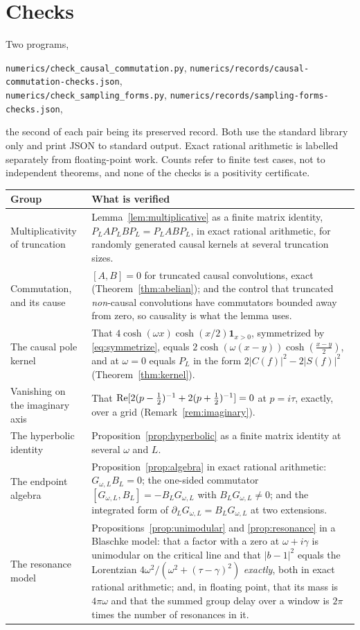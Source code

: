 \section{Checks}\label{app:checks}

Two programs,
\begin{center}
\texttt{numerics/check\_causal\_commutation.py},\qquad
\texttt{numerics/records/causal-commutation-checks.json},\\[2pt]
\texttt{numerics/check\_sampling\_forms.py},\qquad
\texttt{numerics/records/sampling-forms-checks.json},
\end{center}
the second of each pair being its preserved record. Both use the standard library
only and print JSON to standard output. Exact rational arithmetic is labelled separately
from floating-point work. Counts refer to finite test cases, not to independent
theorems, and none of the checks is a positivity certificate.

\begin{center}
\begin{tabular}{@{}p{}p{}@{}}
\toprule
Group & What is verified\\
\midrule
Multiplicativity of truncation &
Lemma~\ref{lem:multiplicative} as a finite matrix identity,
$P_LAP_LBP_L=P_LABP_L$, in exact rational arithmetic, for randomly generated
causal kernels at several truncation sizes.\\
Commutation, and its cause &
$[A,B]=0$ for truncated causal convolutions, exact
(Theorem~\ref{thm:abelian}); and the control that truncated \emph{non}-causal
convolutions have commutators bounded away from zero, so causality is what the
lemma uses.\\
The causal pole kernel &
That $4\cosh(\omega x)\cosh(x/2)\mathbf1_{x>0}$, symmetrized by
\eqref{eq:symmetrize}, equals $2\cosh(\omega(x-y))\cosh(\frac{x-y}2)$, and at
$\omega=0$ equals $P_L$ in the form $2|C(f)|^2-2|S(f)|^2$
(Theorem~\ref{thm:kernel}).\\
Vanishing on the imaginary axis &
That $\operatorname{Re}[2(p-\frac12)^{-1}+2(p+\frac12)^{-1}]=0$ at $p=i\tau$, exactly, over a
grid (Remark~\ref{rem:imaginary}).\\
The hyperbolic identity &
Proposition~\ref{prop:hyperbolic} as a finite matrix identity at several
$\omega$ and $L$.\\
The endpoint algebra &
Proposition~\ref{prop:algebra} in exact rational arithmetic: $G_{\omega,L}B_L=0$;
the one-sided commutator $[G_{\omega,L},B_L]=-B_LG_{\omega,L}$ with
$B_LG_{\omega,L}\neq0$; and the integrated form of
$\partial_LG_{\omega,L}=B_LG_{\omega,L}$ at two extensions.\\
The resonance model &
Propositions~\ref{prop:unimodular} and \ref{prop:resonance} in a Blaschke model:
that a factor with a zero at $\omega+i\gamma$ is unimodular on the critical line
and that $|b-1|^2$ equals the Lorentzian $4\omega^2/(\omega^2+(\tau-\gamma)^2)$
\emph{exactly}, both in exact rational arithmetic; and, in floating point, that
its mass is $4\pi\omega$ and that the summed group delay over a window is $2\pi$
times the number of resonances in it.\\
\bottomrule
\end{tabular}
\end{center}

